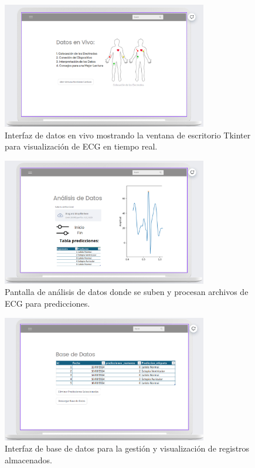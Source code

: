\begin{figure}[h]
\centering
\includegraphics[width=0.8\textwidth]{img/prototipo_interfaz/2.png}
\caption{Interfaz de datos en vivo mostrando la ventana de escritorio Tkinter para visualización de ECG en tiempo real.}
\label{fig:datos-vivo}
\end{figure}

\begin{figure}[h]
\centering
\includegraphics[width=0.8\textwidth]{img/prototipo_interfaz/3.png}
\caption{Pantalla de análisis de datos donde se suben y procesan archivos de ECG para predicciones.}
\label{fig:analisis-datos}
\end{figure}

\begin{figure}[h]
\centering
\includegraphics[width=0.8\textwidth]{img/prototipo_interfaz/4.png}
\caption{Interfaz de base de datos para la gestión y visualización de registros almacenados.}
\label{fig:gestion-datos}
\end{figure}

